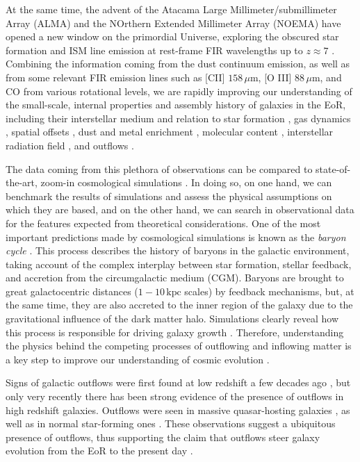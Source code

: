 At the same time, the advent of the Atacama Large Millimeter/submillimeter Array (ALMA) and the NOrthern Extended Millimeter Array (NOEMA) have opened a new window on the primordial Universe, exploring the obscured star formation and ISM line emission at rest-frame FIR wavelengths up to $z\approx7$ \citep{maiolino2015,pentericci2016, matthee2017, Hashimoto2018}. Combining the information coming from the dust continuum emission, as well as from some relevant FIR emission lines such as [CII] $158 \,\mu\mathrm{m}$, [O III] $88 \,\mu\mathrm{m}$, and CO from various rotational levels, we are rapidly improving our understanding of the small-scale, internal properties and assembly history of galaxies in the EoR, including their interstellar medium and relation to star formation \citep{capak2015, carniani2017}, gas dynamics \citep{smit:2018}, spatial offsets \citep{inoue2016, Laporte17, carniani2018}, dust and metal enrichment \citep{capak2015, Knudsen:2017, Laporte17, Tamura:2019}, molecular content \citep{dodorico:2018}, interstellar radiation field \citep{Stark15}, and outflows \citep{gallerani:2018, Fujimoto19, ginolfi:2019, herrera2021kiloparsec}.

The data coming from this plethora of observations can be compared to state-of-the-art, zoom-in cosmological simulations \citep{pallottini2017, Hopkins18, pallottini:2019}. In doing so, on one hand, we can benchmark the results of simulations and assess the physical assumptions on which they are based, and on the other hand, we can search in observational data for the features expected from theoretical considerations. One of the most important predictions made by cosmological simulations is known as the \textit{baryon cycle} \citep{peroux2020cosmic}. This process describes the history of baryons in the galactic environment, taking account of the complex interplay between star formation, stellar feedback, and accretion from the circumgalactic medium (CGM). Baryons are brought to great galactocentric distances ($1-10\,\mathrm{kpc}$ scales) by feedback mechanisms, but, at the same time, they are also accreted to the inner region of the galaxy due to the gravitational influence of the dark matter halo. Simulations clearly reveal how this process is responsible for driving galaxy growth \citep{tumlison}. Therefore, understanding the physics behind the competing processes of outflowing and inflowing matter is a key step to improve our understanding of cosmic evolution \citep{2005ARA&A..43..769V}.

Signs of galactic outflows were first found at low redshift a few decades ago \citep{chevalier_clegg:1985, Walter:2002vq}, but only very recently there has been strong evidence of the presence of outflows in high redshift galaxies. Outflows were seen in massive quasar-hosting galaxies \citep{cicone2015}, as well as in normal star-forming ones \citep{gallerani:2018, ginolfi:2019, Sugahara19, herrera2021kiloparsec}. These observations suggest a ubiquitous presence of outflows, thus supporting the claim that outflows steer galaxy evolution from the EoR to the present day \citep{veilleux2020cool}. 

